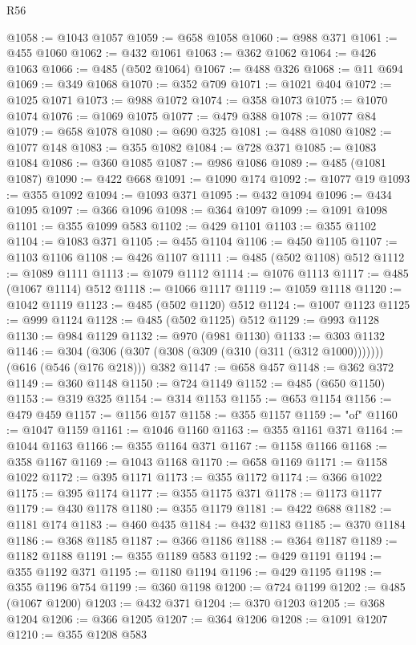 \begin{lexlean}{R56}
\begin{coremodule}
@1058 := @1043 @1057
@1059 := @658 @1058
@1060 := @988 @371
@1061 := @455 @1060
@1062 := @432 @1061
@1063 := @362 @1062
@1064 := @426 @1063
@1066 := @485 (@502 @1064)
@1067 := @488 @326
@1068 := @11 @694
@1069 := @349 @1068
@1070 := @352 @709
@1071 := @1021 @404
@1072 := @1025 @1071
@1073 := @988 @1072
@1074 := @358 @1073
@1075 := @1070 @1074
@1076 := @1069 @1075
@1077 := @479 @388
@1078 := @1077 @84
@1079 := @658 @1078
@1080 := @690 @325
@1081 := @488 @1080
@1082 := @1077 @148
@1083 := @355 @1082
@1084 := @728 @371
@1085 := @1083 @1084
@1086 := @360 @1085
@1087 := @986 @1086
@1089 := @485 (@1081 @1087)
@1090 := @422 @668
@1091 := @1090 @174
@1092 := @1077 @19
@1093 := @355 @1092
@1094 := @1093 @371
@1095 := @432 @1094
@1096 := @434 @1095
@1097 := @366 @1096
@1098 := @364 @1097
@1099 := @1091 @1098
@1101 := @355 @1099 @583
@1102 := @429 @1101
@1103 := @355 @1102
@1104 := @1083 @371
@1105 := @455 @1104
@1106 := @450 @1105
@1107 := @1103 @1106
@1108 := @426 @1107
@1111 := @485 (@502 @1108) @512
@1112 := @1089 @1111
@1113 := @1079 @1112
@1114 := @1076 @1113
@1117 := @485 (@1067 @1114) @512
@1118 := @1066 @1117
@1119 := @1059 @1118
@1120 := @1042 @1119
@1123 := @485 (@502 @1120) @512
@1124 := @1007 @1123
@1125 := @999 @1124
@1128 := @485 (@502 @1125) @512
@1129 := @993 @1128
@1130 := @984 @1129
@1132 := @970 (@981 @1130)
@1133 := @303 @1132
@1146 := @304 (@306 (@307 (@308 (@309 (@310 (@311 (@312 @1000))))))) (@616 (@546 (@176 @218))) @382
@1147 := @658 @457
@1148 := @362 @372
@1149 := @360 @1148
@1150 := @724 @1149
@1152 := @485 (@650 @1150)
@1153 := @319 @325
@1154 := @314 @1153
@1155 := @653 @1154
@1156 := @479 @459
@1157 := @1156 @157
@1158 := @355 @1157
@1159 := "of"
@1160 := @1047 @1159
@1161 := @1046 @1160
@1163 := @355 @1161 @371
@1164 := @1044 @1163
@1166 := @355 @1164 @371
@1167 := @1158 @1166
@1168 := @358 @1167
@1169 := @1043 @1168
@1170 := @658 @1169
@1171 := @1158 @1022
@1172 := @395 @1171
@1173 := @355 @1172
@1174 := @366 @1022
@1175 := @395 @1174
@1177 := @355 @1175 @371
@1178 := @1173 @1177
@1179 := @430 @1178
@1180 := @355 @1179
@1181 := @422 @688
@1182 := @1181 @174
@1183 := @460 @435
@1184 := @432 @1183
@1185 := @370 @1184
@1186 := @368 @1185
@1187 := @366 @1186
@1188 := @364 @1187
@1189 := @1182 @1188
@1191 := @355 @1189 @583
@1192 := @429 @1191
@1194 := @355 @1192 @371
@1195 := @1180 @1194
@1196 := @429 @1195
@1198 := @355 @1196 @754
@1199 := @360 @1198
@1200 := @724 @1199
@1202 := @485 (@1067 @1200)
@1203 := @432 @371
@1204 := @370 @1203
@1205 := @368 @1204
@1206 := @366 @1205
@1207 := @364 @1206
@1208 := @1091 @1207
@1210 := @355 @1208 @583

\end{coremodule}
\end{lexlean}

